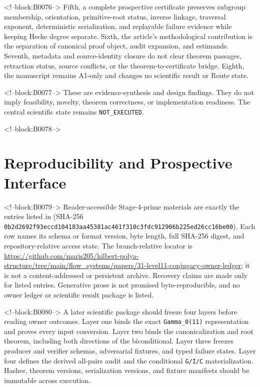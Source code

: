 \documentclass[11pt]{article}
\begin{document}
<!--block:B0076-->
Fifth, a complete prospective certificate preserves subgroup membership,
orientation, primitive-root status, inverse linkage, traversal exponent,
deterministic serialization, and replayable failure evidence while
keeping Hecke degree separate. Sixth, the article's methodological
contribution is the separation of canonical proof object, audit
expansion, and estimands. Seventh, metadata and source-identity closure
do not clear theorem passages, retraction status, source conflicts, or
the theorem-to-certificate bridge. Eighth, the manuscript remains A1-only
and changes no scientific result or Route state.

<!--block:B0077-->
These are evidence-synthesis and design findings. They do not imply
feasibility, novelty, theorem correctness, or implementation readiness.
The central scientific state remains \texttt{NOT\_EXECUTED}.

<!--block:B0078-->
\hypertarget{6-reproducibility-and-prospective-interface}{%
\section{Reproducibility and Prospective
Interface}\label{6-reproducibility-and-prospective-interface}}

<!--block:B0079-->
\begingroup\sloppy
Reader-accessible Stage-4-prime materials are exactly the entries listed in
 (SHA-256
\texttt{0b2d2692f93eccd1\allowbreak{}04183aa45381ac46\allowbreak{}1f310c3fdc912906\allowbreak{}b225ed26cc16be00}).  Each row names its schema or format version, byte
length, full SHA-256 digest, and repository-relative access state.  The
branch-relative locator is
\url{https://github.com/maris205/hilbert-polya-structure/tree/main/flow_systems/papers/31-level11-conjugacy-owner-ledger};
it is not a content-addressed or persistent archive.  Recovery claims are made
only for listed entries.  Generative prose is not promised byte-reproducible,
and no owner ledger or scientific result package is listed.
\par\endgroup

<!--block:B0080-->
A later scientific package should freeze four layers before reading
owner outcomes. Layer one binds the exact \texttt{Gamma\_0(11)}
representation and proves every input conversion. Layer two binds the
canonicalization and root theorem, including both directions of the
biconditional. Layer three freezes producer and verifier schemas,
adversarial fixtures, and typed failure states. Layer four defines the
derived all-pairs audit and the conditional \texttt{G/I/C}
materialization. Hashes, theorem versions, serialization versions, and
fixture manifests should be immutable across execution.
\end{document}

